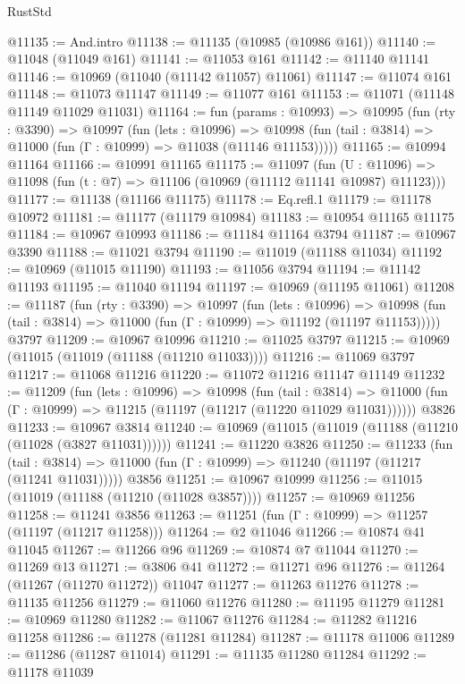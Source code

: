 \begin{lexlean}{RustStd}
\begin{coremodule}
@11135 := And.intro
@11138 := @11135 (@10985 (@10986 @161))
@11140 := @11048 (@11049 @161)
@11141 := @11053 @161
@11142 := @11140 @11141
@11146 := @10969 (@11040 (@11142 @11057) @11061)
@11147 := @11074 @161
@11148 := @11073 @11147
@11149 := @11077 @161
@11153 := @11071 (@11148 @11149 @11029 @11031)
@11164 := fun (params : @10993) =>
  @10995
    (fun (rty : @3390) =>
    @10997
      (fun (lets : @10996) =>
      @10998 (fun (tail : @3814) => @11000 (fun (Γ : @10999) => @11038 (@11146 @11153)))))
@11165 := @10994 @11164
@11166 := @10991 @11165
@11175 := @11097
    (fun (U : @11096) => @11098 (fun (t : @7) => @11106 (@10969 (@11112 @11141 @10987) @11123)))
@11177 := @11138 (@11166 @11175)
@11178 := Eq.refl.{1}
@11179 := @11178 @10972
@11181 := @11177 (@11179 @10984)
@11183 := @10954 @11165 @11175
@11184 := @10967 @10993
@11186 := @11184 @11164 @3794
@11187 := @10967 @3390
@11188 := @11021 @3794
@11190 := @11019 (@11188 @11034)
@11192 := @10969 (@11015 @11190)
@11193 := @11056 @3794
@11194 := @11142 @11193
@11195 := @11040 @11194
@11197 := @10969 (@11195 @11061)
@11208 := @11187
    (fun (rty : @3390) =>
    @10997
      (fun (lets : @10996) =>
      @10998 (fun (tail : @3814) => @11000 (fun (Γ : @10999) => @11192 (@11197 @11153)))))
    @3797
@11209 := @10967 @10996
@11210 := @11025 @3797
@11215 := @10969 (@11015 (@11019 (@11188 (@11210 @11033))))
@11216 := @11069 @3797
@11217 := @11068 @11216
@11220 := @11072 @11216 @11147 @11149
@11232 := @11209
    (fun (lets : @10996) =>
    @10998
      (fun (tail : @3814) =>
      @11000 (fun (Γ : @10999) => @11215 (@11197 (@11217 (@11220 @11029 @11031))))))
    @3826
@11233 := @10967 @3814
@11240 := @10969 (@11015 (@11019 (@11188 (@11210 (@11028 (@3827 @11031))))))
@11241 := @11220 @3826
@11250 := @11233
    (fun (tail : @3814) => @11000 (fun (Γ : @10999) => @11240 (@11197 (@11217 (@11241 @11031)))))
    @3856
@11251 := @10967 @10999
@11256 := @11015 (@11019 (@11188 (@11210 (@11028 @3857))))
@11257 := @10969 @11256
@11258 := @11241 @3856
@11263 := @11251 (fun (Γ : @10999) => @11257 (@11197 (@11217 @11258)))
@11264 := @2 @11046
@11266 := @10874 @41 @11045
@11267 := @11266 @96
@11269 := @10874 @7 @11044
@11270 := @11269 @13
@11271 := @3806 @41
@11272 := @11271 @96
@11276 := @11264 (@11267 (@11270 @11272)) @11047
@11277 := @11263 @11276
@11278 := @11135 @11256
@11279 := @11060 @11276
@11280 := @11195 @11279
@11281 := @10969 @11280
@11282 := @11067 @11276
@11284 := @11282 @11216 @11258
@11286 := @11278 (@11281 @11284)
@11287 := @11178 @11006
@11289 := @11286 (@11287 @11014)
@11291 := @11135 @11280 @11284
@11292 := @11178 @11039

\end{coremodule}
\end{lexlean}

